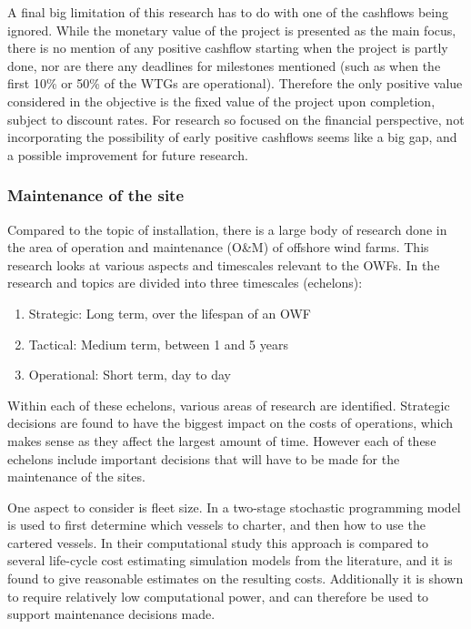 \documentclass[a4paper,12pt]{article}
\begin{document}
A final big limitation of this research has to do with one of the cashflows being ignored. While the monetary value of the project is presented as the main focus, there is no mention of any positive cashflow starting when the project is partly done, nor are there any deadlines for milestones mentioned (such as when the first 10\% or 50\% of the WTGs are operational). Therefore the only positive value considered in the objective is the fixed value of the project upon completion, subject to discount rates. For research so focused on the financial perspective, not incorporating the possibility of early positive cashflows seems like a big gap, and a possible improvement for future research.

\subsubsection{Maintenance of the site} \label{sss:maint}

Compared to the topic of installation, there is a large body of research done in the area of operation and maintenance (O\&M) of offshore wind farms. This research looks at various aspects and timescales relevant to the OWFs. In \cite{shafiee2015maintenance} the research and topics are divided into three timescales (echelons):

\begin{enumerate}
\item Strategic: Long term, over the lifespan of an OWF
\item Tactical: Medium term, between 1 and 5 years
\item Operational: Short term, day to day
\end{enumerate}

Within each of these echelons, various areas of research are identified. Strategic decisions are found to have the biggest impact on the costs of operations, which makes sense as they affect the largest amount of time. However each of these echelons include important decisions that will have to be made for the maintenance of the sites. 

One aspect to consider is fleet size. In \cite{staalhane2019optimizing} a two-stage stochastic programming model is used to first determine which vessels to charter, and then how to use the cartered vessels. In their computational study this approach is compared to several life-cycle cost estimating simulation models from the literature, and it is found to give reasonable estimates on the resulting costs. Additionally it is shown to require relatively low computational power, and can therefore be used to support maintenance decisions made. 
\end{document}
